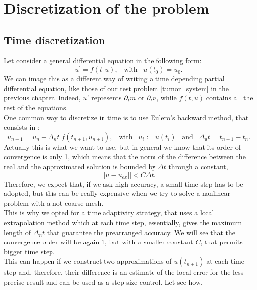 \chapter{Discretization of the problem}
\section{Time discretization}
Let consider a general differential equation in the following form: 
\begin{equation}
\label{diff_time}
u^\prime = f(t,u), \; \; \; \text{with} \; \;\; u(t_0) = u_0.
\end{equation} 
We can image this as a different way of writing a time depending partial differential equation, like those of our test problem \eqref{tumor_system} in the previous chapter. Indeed, $ u' $ represents $ \partial_t m $ or $ \partial_t n $, while $ f(t,u) $ contains all the rest of the equations. \\
One common way to discretize in time is to use Eulero's backward method, that consists in :
\begin{equation*}
u_{n+1} = u_n +  \Delta_n t \; f(t_{n+1}, u_{n+1}), \; \; \; \text{with}\; \; \; u_i := u(t_i)\; \;\; \text{and} \; \;\; \Delta_n t = t_{n+1}-t_n .
\end{equation*}
Actually this is what we want to use, but in general we know that its order of convergence is only 1, which means that the norm of the difference between the real and the approximated solution is bounded by $ \Delta t $ through a constant,
\begin{equation}
|| u - u_{ex}|| < C \Delta t.
\label{ord_1}
\end{equation}
 Therefore, we expect that, if we ask high accuracy, a small time step has to be adopted, but this can be really expensive when we try to solve a nonlinear problem with a not coarse mesh. \\
This is why we opted for a time adaptivity strategy, that uses a local extrapolation method which at each time step, essentially, gives the maximum length of $ \Delta_n t $ that guarantee the prearranged accuracy. We will see that the convergence order will be again 1, but with a smaller constant $ C $, that permits bigger time step.\\
This can happen if we construct two approximations of $ u (t_{n+1}) $  at each time step and, therefore, their difference is an estimate of the local error for the less precise result and can be used as a step size control. Let see how.
